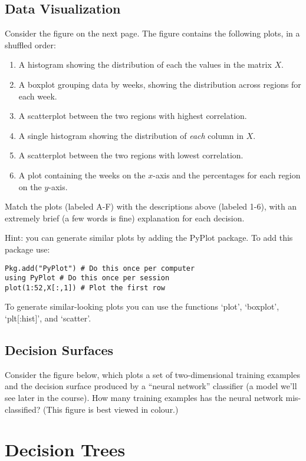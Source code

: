 \documentclass{article}
\def\blu#1{{\color{blu}#1}}
\def\enum#1{\begin{enumerate}#1\end{enumerate}}
\begin{document}
\subsection{Data Visualization}

Consider the figure on the next page.
The figure contains the following plots, in a shuffled order:
\enum{
\item A histogram showing the distribution of each the values in the matrix $X$.
\item A boxplot grouping data by weeks, showing the distribution across regions for each week.
\item A scatterplot between the two regions with highest correlation.
\item A single histogram showing the distribution of \emph{each} column in $X$.
\item A scatterplot between the two regions with lowest correlation.
\item A plot containing the weeks on the $x$-axis and the percentages for each region on the $y$-axis.
}
\blu{Match the plots (labeled A-F) with the descriptions above (labeled 1-6), with an extremely brief (a few words is fine) explanation for each decision.}

Hint: you can generate similar plots by adding the PyPlot package. To add this package use:
\begin{verbatim}
Pkg.add("PyPlot") # Do this once per computer
using PyPlot # Do this once per session
plot(1:52,X[:,1]) # Plot the first row
\end{verbatim}
To generate similar-looking plots you can use the functions `plot', `boxplot', `plt[:hist]', and `scatter'.


\subsection{Decision Surfaces}

Consider the figure below, which plots a set of two-dimensional training examples and the decision surface produced by a ``neural network'' classifier (a model we'll see later in the course).
\blu{How many training examples has the neural network mis-classified?} (This figure is best viewed in colour.)

\section{Decision Trees}
\end{document}
